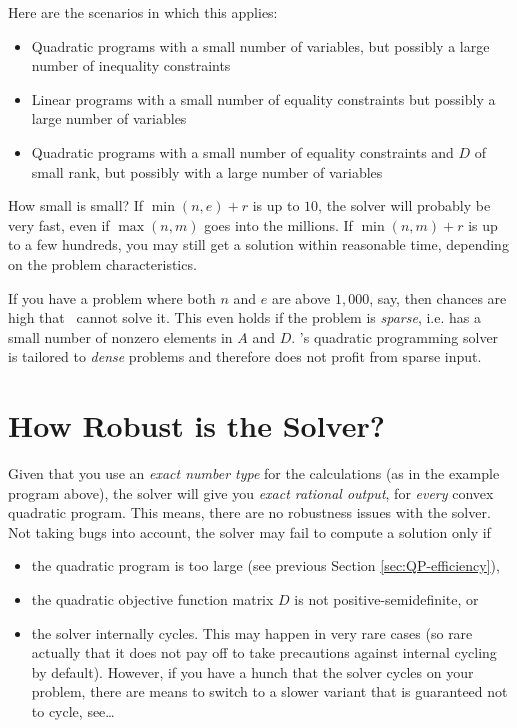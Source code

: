 Here are the scenarios in which this applies:
\begin{itemize}
\item Quadratic programs with a small number of variables, but
  possibly a large number of inequality constraints
\item Linear programs with a small number of equality constraints but
  possibly a large number of variables
\item Quadratic programs with a small number of equality constraints and
  $D$ of small rank, but possibly with a large number of variables
\end{itemize} 

How small is small? If $\min(n,e)+r$ is up to $10$, the solver will
probably be very fast, even if $\max(n,m)$ goes into the millions. 
If $\min(n,m)+r$ is up to a few hundreds, you may still get a solution 
within reasonable time, depending on the problem characteristics.

If you have a problem where both $n$ and $e$ are above
$1,000$, say, then chances are high that \cgal\ cannot solve it.
This even holds if the problem is \emph{sparse}, i.e. has a small
number of nonzero elements in $A$ and $D$. \cgal's quadratic programming
solver is tailored to \emph{dense} problems and therefore does not 
profit from sparse input.

\section{How Robust is the Solver?}
Given that you use an \emph{exact number type} for the 
calculations (as in the example program above), the solver
will give you \emph{exact rational output}, for \emph{every}
convex quadratic program. This means, there are no robustness
issues with the solver. Not taking bugs into account, the solver 
may fail to compute a solution only if
\begin{itemize}
\item the quadratic program is too large (see previous Section 
\ref{sec:QP-efficiency}), 
\item the quadratic objective function matrix $D$ is not 
positive-semidefinite, or
\item the solver internally cycles. This may happen in very rare
cases (so rare actually that it does not pay off to take
precautions against internal cycling by default). However, if
you have a hunch that the solver cycles on your problem,
there are means to switch to a slower variant that is guaranteed
not to cycle, see\ldots 
\end{itemize}

